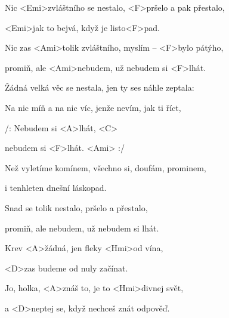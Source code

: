 

\zs
Nic <Emi>zvláštního se nestalo, <F>pršelo a pak přestalo,

<Emi>jak to bejvá, když je listo<F>pad.

Nic zas <Ami>tolik zvláštního, myslím – <F>bylo pátýho,

promiň, ale <Ami>nebudem, už nebudem si <F>lhát.
\ks

\zs
Žádná velká věc se nestala, jen ty ses náhle zeptala:


Na nic míň a na nic víc, jenže nevím, jak ti říct,

\ks

\zr
/: Nebudem si <A>lhát, <C>

nebudem si <F>lhát. <Ami> :/
\kr

\zs
Než vyletíme komínem, všechno si, doufám, prominem,

i tenhleten dnešní láskopad.

Snad se tolik nestalo, pršelo a přestalo,

promiň, ale nebudem, už nebudem si lhát.
\ks

\zr
\kr

\zs
Krev <A>žádná, jen fleky <Hmi>od vína,

<D>zas budeme od nuly začínat.

Jo, holka, <A>znáš to, je to <Hmi>divnej svět,

a <D>neptej se, když nechceš znát odpověď.
\ks

\zr
\kr

\kp
